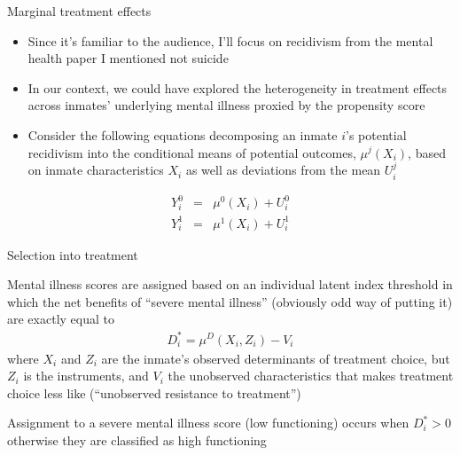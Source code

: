\documentclass{beamer}
\begin{document}
\begin{frame}{Marginal treatment effects}

\begin{itemize}
\item Since it's familiar to the audience, I'll focus on recidivism from the mental health paper I mentioned not suicide
\item In our context, we could have explored the heterogeneity in treatment effects across inmates' underlying mental illness proxied by the propensity score
\item Consider the following equations decomposing an inmate $i$'s potential recidivism into the conditional means of potential outcomes, $\mu^j(X_i)$, based on inmate characteristics $X_i$ as well as deviations from the mean $U_i^j$
\end{itemize}

\begin{eqnarray*}
Y_i^0 &=& \mu^0(X_i) + U_i^0 \\
Y_i^1 &=& \mu^1(X_i) + U_i^1 
\end{eqnarray*}

\end{frame}

\begin{frame}{Selection into treatment}


Mental illness scores are assigned based on an individual latent index threshold in which the net benefits of ``severe mental illness'' (obviously odd way of putting it) are exactly equal to
\bigskip
\begin{eqnarray*}
D_i^* = \mu^D(X_i,Z_i) - V_i
\end{eqnarray*}where $X_i$ and $Z_i$ are the inmate's observed determinants of treatment choice, but $Z_i$ is the instruments, and $V_i$ the unobserved characteristics that makes treatment choice less like (``unobserved resistance to treatment'')

\bigskip

Assignment to a severe mental illness score (low functioning) occurs when $D_i^*>0$ otherwise they are classified as high functioning

\end{frame}
\end{document}
